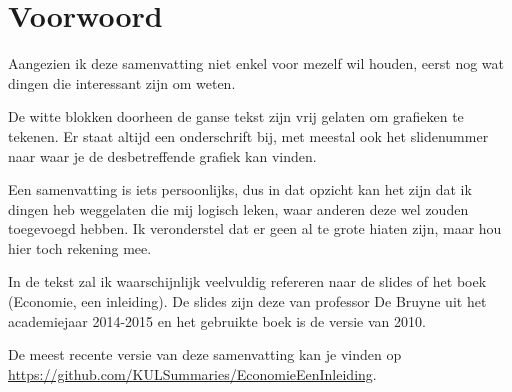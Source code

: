 \section*{Voorwoord}
Aangezien ik deze samenvatting niet enkel voor mezelf wil houden, eerst nog wat dingen die interessant zijn om weten.

De witte blokken doorheen de ganse tekst zijn vrij gelaten om grafieken te tekenen. Er staat altijd een onderschrift bij, met meestal ook het slidenummer naar waar je de desbetreffende grafiek kan vinden.

Een samenvatting is iets persoonlijks, dus in dat opzicht kan het zijn dat ik dingen heb weggelaten die mij logisch leken, waar anderen deze wel zouden toegevoegd hebben. Ik veronderstel dat er geen al te grote hiaten zijn, maar hou hier toch rekening mee.

In de tekst zal ik waarschijnlijk veelvuldig refereren naar de slides of het boek (Economie, een inleiding). De slides zijn deze van professor De Bruyne uit het academiejaar 2014-2015 en het gebruikte boek is de versie van 2010.

De meest recente versie van deze samenvatting kan je vinden op \url{https://github.com/KULSummaries/EconomieEenInleiding}.
